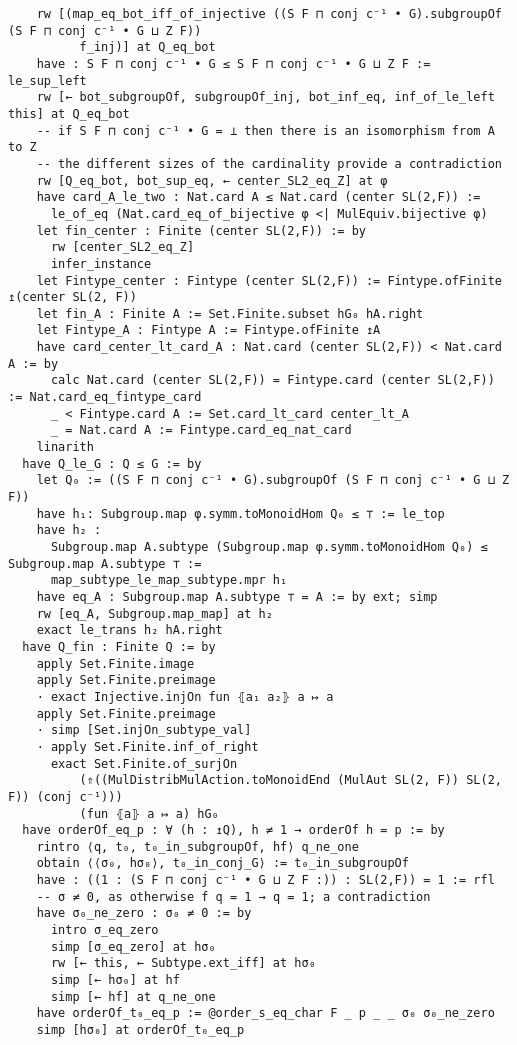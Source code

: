 \begin{tiny}
\begin{verbatim}
    rw [(map_eq_bot_iff_of_injective ((S F ⊓ conj c⁻¹ • G).subgroupOf (S F ⊓ conj c⁻¹ • G ⊔ Z F))
          f_inj)] at Q_eq_bot
    have : S F ⊓ conj c⁻¹ • G ≤ S F ⊓ conj c⁻¹ • G ⊔ Z F := le_sup_left
    rw [← bot_subgroupOf, subgroupOf_inj, bot_inf_eq, inf_of_le_left this] at Q_eq_bot
    -- if S F ⊓ conj c⁻¹ • G = ⊥ then there is an isomorphism from A to Z
    -- the different sizes of the cardinality provide a contradiction
    rw [Q_eq_bot, bot_sup_eq, ← center_SL2_eq_Z] at φ
    have card_A_le_two : Nat.card A ≤ Nat.card (center SL(2,F)) :=
      le_of_eq (Nat.card_eq_of_bijective φ <| MulEquiv.bijective φ)
    let fin_center : Finite (center SL(2,F)) := by
      rw [center_SL2_eq_Z]
      infer_instance
    let Fintype_center : Fintype (center SL(2,F)) := Fintype.ofFinite ↥(center SL(2, F))
    let fin_A : Finite A := Set.Finite.subset hG₀ hA.right
    let Fintype_A : Fintype A := Fintype.ofFinite ↥A
    have card_center_lt_card_A : Nat.card (center SL(2,F)) < Nat.card A := by
      calc Nat.card (center SL(2,F)) = Fintype.card (center SL(2,F)) := Nat.card_eq_fintype_card
      _ < Fintype.card A := Set.card_lt_card center_lt_A
      _ = Nat.card A := Fintype.card_eq_nat_card
    linarith
  have Q_le_G : Q ≤ G := by
    let Q₀ := ((S F ⊓ conj c⁻¹ • G).subgroupOf (S F ⊓ conj c⁻¹ • G ⊔ Z F))
    have h₁: Subgroup.map φ.symm.toMonoidHom Q₀ ≤ ⊤ := le_top
    have h₂ :
      Subgroup.map A.subtype (Subgroup.map φ.symm.toMonoidHom Q₀) ≤ Subgroup.map A.subtype ⊤ :=
      map_subtype_le_map_subtype.mpr h₁
    have eq_A : Subgroup.map A.subtype ⊤ = A := by ext; simp
    rw [eq_A, Subgroup.map_map] at h₂
    exact le_trans h₂ hA.right
  have Q_fin : Finite Q := by
    apply Set.Finite.image
    apply Set.Finite.preimage
    · exact Injective.injOn fun ⦃a₁ a₂⦄ a ↦ a
    apply Set.Finite.preimage
    · simp [Set.injOn_subtype_val]
    · apply Set.Finite.inf_of_right
      exact Set.Finite.of_surjOn
          (⇑((MulDistribMulAction.toMonoidEnd (MulAut SL(2, F)) SL(2, F)) (conj c⁻¹)))
          (fun ⦃a⦄ a ↦ a) hG₀
  have orderOf_eq_p : ∀ (h : ↥Q), h ≠ 1 → orderOf h = p := by
    rintro ⟨q, t₀, t₀_in_subgroupOf, hf⟩ q_ne_one
    obtain ⟨⟨σ₀, hσ₀⟩, t₀_in_conj_G⟩ := t₀_in_subgroupOf
    have : ((1 : (S F ⊓ conj c⁻¹ • G ⊔ Z F :)) : SL(2,F)) = 1 := rfl
    -- σ ≠ 0, as otherwise f q = 1 → q = 1; a contradiction
    have σ₀_ne_zero : σ₀ ≠ 0 := by
      intro σ_eq_zero
      simp [σ_eq_zero] at hσ₀
      rw [← this, ← Subtype.ext_iff] at hσ₀
      simp [← hσ₀] at hf
      simp [← hf] at q_ne_one
    have orderOf_t₀_eq_p := @order_s_eq_char F _ p _ _ σ₀ σ₀_ne_zero
    simp [hσ₀] at orderOf_t₀_eq_p

\end{verbatim}
\end{tiny}
